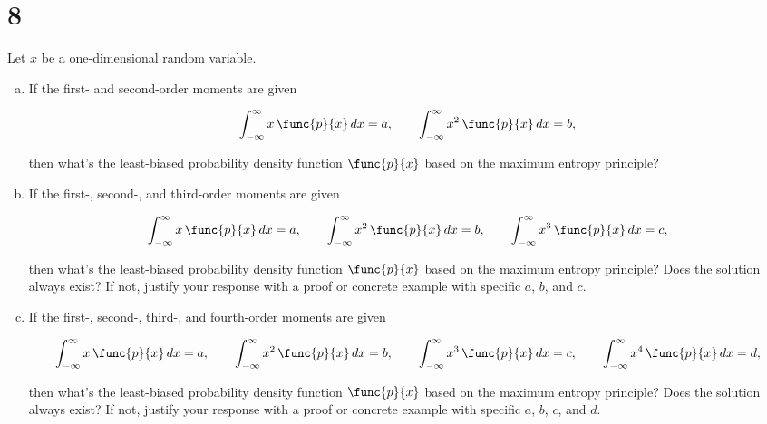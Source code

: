 \section{8}

Let $x$ be a one-dimensional random variable.

\begin{enumerate}[(a)]
	\item If the first- and second-order moments are given
	
	\begin{equation}
		\int_{-\infty}^{\infty} x\,\func{p}{x}\,dx = a,\qquad \int_{-\infty}^{\infty} x^2\,\func{p}{x}\,dx = b,
	\end{equation}
	
	then what's the least-biased probability density function $\func{p}{x}$ based on the maximum entropy principle?
	
	\item If the first-, second-, and third-order moments are given
	
	\begin{equation}
		\int_{-\infty}^{\infty} x\,\func{p}{x}\,dx = a,\qquad \int_{-\infty}^{\infty} x^2\,\func{p}{x}\,dx = b,\qquad \int_{-\infty}^{\infty} x^3\,\func{p}{x}\,dx = c,
	\end{equation}
	
	then what's the least-biased probability density function $\func{p}{x}$ based on the maximum entropy principle? Does the solution always exist? If not, justify your response with a proof or concrete example with specific $a$, $b$, and $c$.
	
	\item If the first-, second-, third-, and fourth-order moments are given
	
	\begin{equation}
		\int_{-\infty}^{\infty} x\,\func{p}{x}\,dx = a,\qquad \int_{-\infty}^{\infty} x^2\,\func{p}{x}\,dx = b,\qquad \int_{-\infty}^{\infty} x^3\,\func{p}{x}\,dx = c,\qquad \int_{-\infty}^{\infty} x^4\,\func{p}{x}\,dx = d,
	\end{equation}
	
	then what's the least-biased probability density function $\func{p}{x}$ based on the maximum entropy principle? Does the solution always exist? If not, justify your response with a proof or concrete example with specific $a$, $b$, $c$, and $d$.
\end{enumerate}

